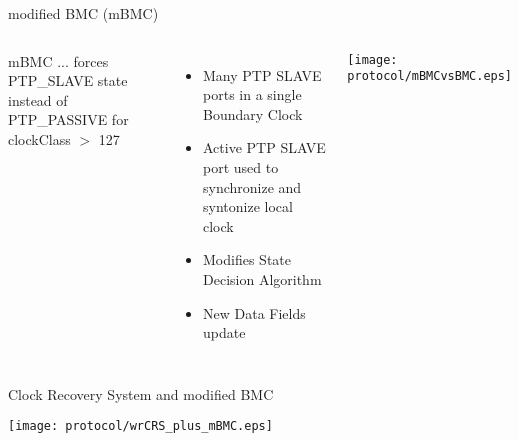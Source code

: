 \documentclass[compress,red]{beamer}
\begin{document}
\begin{frame}{modified BMC (mBMC)}

\begin{columns}[c]

    \begin{block}{mBMC}
    ... forces PTP\_SLAVE state instead of PTP\_PASSIVE for clockClass $>$ 127
    \end{block}

    \begin{itemize}
	\item Many PTP SLAVE ports in a single Boundary Clock
	\item Active PTP SLAVE port used to synchronize and syntonize local clock
	\item Modifies State Decision Algorithm
	\item New Data Fields update
      \end{itemize}

    \begin{center}
    \texttt{[image: protocol/mBMCvsBMC.eps]}
    \end{center}

\end{columns}

\end{frame}
\begin{frame}{Clock Recovery System and modified BMC}


  \begin{center}
  \texttt{[image: protocol/wrCRS\_plus\_mBMC.eps]}
  \end{center}

\end{frame}
\end{document}
